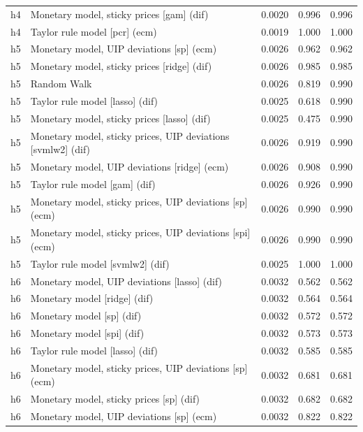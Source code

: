 \begin{ThreePartTable}
\begin{longtable}[t]{cp{5.5cm}ccc}
h4 & \raggedright Monetary model, sticky prices [gam] (dif) & 0.0020 & 0.996 & 0.996\\
h4 & \raggedright Taylor rule model [pcr] (ecm) & 0.0019 & 1.000 & 1.000\\
\addlinespace
h5 & \raggedright Monetary model, UIP deviations [sp] (ecm) & 0.0026 & 0.962 & 0.962\\
h5 & \raggedright Monetary model, sticky prices [ridge] (dif) & 0.0026 & 0.985 & 0.985\\
h5 & \raggedright Random Walk & 0.0026 & 0.819 & 0.990\\
h5 & \raggedright Taylor rule model [lasso] (dif) & 0.0025 & 0.618 & 0.990\\
h5 & \raggedright Monetary model, sticky prices [lasso] (dif) & 0.0025 & 0.475 & 0.990\\
h5 & \raggedright Monetary model, sticky prices, UIP deviations [svmlw2] (dif) & 0.0026 & 0.919 & 0.990\\
h5 & \raggedright Monetary model, UIP deviations [ridge] (ecm) & 0.0026 & 0.908 & 0.990\\
h5 & \raggedright Taylor rule model [gam] (dif) & 0.0026 & 0.926 & 0.990\\
h5 & \raggedright Monetary model, sticky prices, UIP deviations [sp] (ecm) & 0.0026 & 0.990 & 0.990\\
h5 & \raggedright Monetary model, sticky prices, UIP deviations [spi] (ecm) & 0.0026 & 0.990 & 0.990\\
h5 & \raggedright Taylor rule model [svmlw2] (dif) & 0.0025 & 1.000 & 1.000\\
\addlinespace
h6 & \raggedright Monetary model, UIP deviations [lasso] (dif) & 0.0032 & 0.562 & 0.562\\
h6 & \raggedright Monetary model [ridge] (dif) & 0.0032 & 0.564 & 0.564\\
h6 & \raggedright Monetary model [sp] (dif) & 0.0032 & 0.572 & 0.572\\
h6 & \raggedright Monetary model [spi] (dif) & 0.0032 & 0.573 & 0.573\\
h6 & \raggedright Taylor rule model [lasso] (dif) & 0.0032 & 0.585 & 0.585\\
h6 & \raggedright Monetary model, sticky prices, UIP deviations [sp] (ecm) & 0.0032 & 0.681 & 0.681\\
h6 & \raggedright Monetary model, sticky prices [sp] (dif) & 0.0032 & 0.682 & 0.682\\
h6 & \raggedright Monetary model, UIP deviations [sp] (ecm) & 0.0032 & 0.822 & 0.822\\

\end{longtable}
\end{ThreePartTable}

